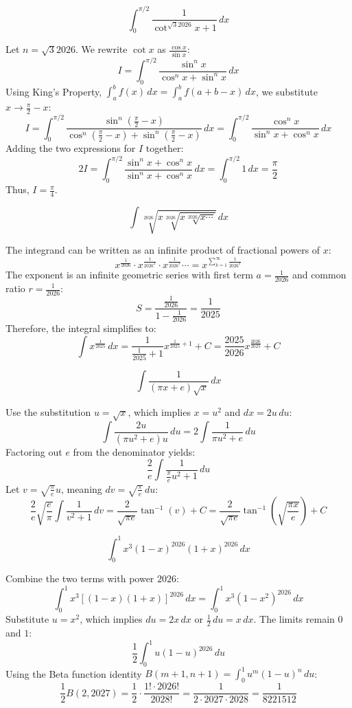 \begin{questions}
\question
\[ \int_{0}^{\pi/2} \frac{1}{\cot^{\sqrt{3}2026} x + 1} \,dx \]
\begin{solution}
Let $n = \sqrt{3}2026$. We rewrite $\cot x$ as $\frac{\cos x}{\sin x}$:
\[ I = \int_{0}^{\pi/2} \frac{\sin^n x}{\cos^n x + \sin^n x} \,dx \]
Using King's Property, $\int_{a}^{b} f(x) \,dx = \int_{a}^{b} f(a+b-x) \,dx$, we substitute $x \to \frac{\pi}{2} - x$:
\[ I = \int_{0}^{\pi/2} \frac{\sin^n(\frac{\pi}{2}-x)}{\cos^n(\frac{\pi}{2}-x) + \sin^n(\frac{\pi}{2}-x)} \,dx = \int_{0}^{\pi/2} \frac{\cos^n x}{\sin^n x + \cos^n x} \,dx \]
Adding the two expressions for $I$ together:
\[ 2I = \int_{0}^{\pi/2} \frac{\sin^n x + \cos^n x}{\sin^n x + \cos^n x} \,dx = \int_{0}^{\pi/2} 1 \,dx = \frac{\pi}{2} \]
Thus, $I = \frac{\pi}{4}$.
\end{solution}

\question
\[ \int \sqrt[2026]{x \sqrt[2026]{x \sqrt[2026]{x \cdots}}} \,dx \]
\begin{solution}
The integrand can be written as an infinite product of fractional powers of $x$:
\[ x^{\frac{1}{2026}} \cdot x^{\frac{1}{2026^2}} \cdot x^{\frac{1}{2026^3}} \cdots = x^{\sum_{k=1}^{\infty} \frac{1}{2026^k}} \]
The exponent is an infinite geometric series with first term $a = \frac{1}{2026}$ and common ratio $r = \frac{1}{2026}$:
\[ S = \frac{\frac{1}{2026}}{1 - \frac{1}{2026}} = \frac{1}{2025} \]
Therefore, the integral simplifies to:
\[ \int x^{\frac{1}{2025}} \,dx = \frac{1}{\frac{1}{2025} + 1} x^{\frac{1}{2025} + 1} + C = \frac{2025}{2026} x^{\frac{2026}{2025}} + C \]
\end{solution}

\question
\[ \int \frac{1}{(\pi x + e)\sqrt{x}} \,dx \]
\begin{solution}
Use the substitution $u = \sqrt{x}$, which implies $x = u^2$ and $dx = 2u \,du$:
\[ \int \frac{2u}{(\pi u^2 + e)u} \,du = 2 \int \frac{1}{\pi u^2 + e} \,du \]
Factoring out $e$ from the denominator yields:
\[ \frac{2}{e} \int \frac{1}{\frac{\pi}{e}u^2 + 1} \,du \]
Let $v = \sqrt{\frac{\pi}{e}}u$, meaning $dv = \sqrt{\frac{\pi}{e}} \,du$:
\[ \frac{2}{e} \sqrt{\frac{e}{\pi}} \int \frac{1}{v^2 + 1} \,dv = \frac{2}{\sqrt{\pi e}} \tan^{-1}(v) + C = \frac{2}{\sqrt{\pi e}} \tan^{-1}\left( \sqrt{\frac{\pi x}{e}} \right) + C \]
\end{solution}

\question
\[ \int_{0}^{1} x^3 (1 - x)^{2026}(1 + x)^{2026} \,dx \]
\begin{solution}
Combine the two terms with power $2026$:
\[ \int_{0}^{1} x^3 \left[(1 - x)(1 + x)\right]^{2026} \,dx = \int_{0}^{1} x^3 (1 - x^2)^{2026} \,dx \]
Substitute $u = x^2$, which implies $du = 2x \,dx$ or $\frac{1}{2} \,du = x \,dx$. The limits remain $0$ and $1$:
\[ \frac{1}{2} \int_{0}^{1} u (1 - u)^{2026} \,du \]
Using the Beta function identity $B(m+1, n+1) = \int_{0}^{1} u^m (1-u)^n \,du$:
\[ \frac{1}{2} B(2, 2027) = \frac{1}{2} \cdot \frac{1! \cdot 2026!}{2028!} = \frac{1}{2 \cdot 2027 \cdot 2028} = \frac{1}{8221512} \]
\end{solution}


\end{questions}
